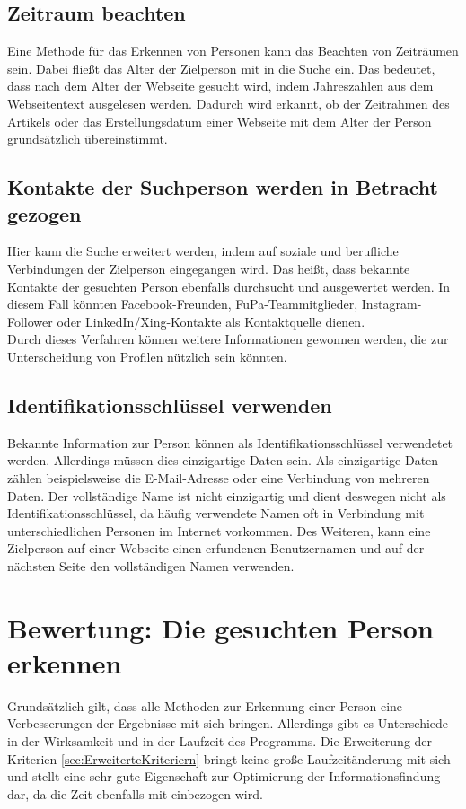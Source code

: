 	\subsection{Zeitraum beachten}
	Eine Methode für das Erkennen von Personen kann das Beachten von Zeiträumen sein. Dabei fließt das Alter der Zielperson mit in die Suche ein. Das bedeutet, dass nach dem Alter der Webseite gesucht wird, indem Jahreszahlen aus dem Webseitentext ausgelesen werden. Dadurch wird erkannt, ob der Zeitrahmen des Artikels oder das Erstellungsdatum einer Webseite mit dem Alter der Person grundsätzlich übereinstimmt.

	\subsection{Kontakte der Suchperson werden in Betracht gezogen}	
	Hier kann die Suche erweitert werden, indem auf soziale und berufliche Verbindungen der Zielperson eingegangen wird. Das heißt, dass bekannte Kontakte der gesuchten Person ebenfalls durchsucht und ausgewertet werden. In diesem Fall könnten Facebook-Freunden, FuPa-Teammitglieder, Instagram-Follower oder LinkedIn/Xing-Kontakte als Kontaktquelle dienen.\\
	Durch dieses Verfahren können weitere Informationen gewonnen werden, die zur Unterscheidung von Profilen nützlich sein könnten.
	
	\subsection{Identifikationsschlüssel verwenden}
	Bekannte Information zur Person können als Identifikationsschlüssel verwendetet werden. Allerdings müssen dies einzigartige Daten sein. Als einzigartige Daten zählen beispielsweise die E-Mail-Adresse oder eine Verbindung von mehreren Daten. Der vollständige Name ist nicht einzigartig und dient deswegen nicht als Identifikationsschlüssel, da häufig verwendete Namen oft in Verbindung mit unterschiedlichen Personen im Internet vorkommen. Des Weiteren, kann eine Zielperson auf einer Webseite einen erfundenen Benutzernamen und auf der nächsten Seite den vollständigen Namen verwenden.\\

\section{Bewertung: Die gesuchten Person erkennen}
Grundsätzlich gilt, dass alle Methoden zur Erkennung einer Person eine Verbesserungen der Ergebnisse mit sich bringen. Allerdings gibt es Unterschiede in der Wirksamkeit und in der Laufzeit des Programms.
Die Erweiterung der Kriterien \ref{sec:ErweiterteKriteriern} bringt keine große Laufzeitänderung mit sich und stellt eine sehr gute Eigenschaft zur Optimierung der Informationsfindung dar, da die Zeit ebenfalls mit einbezogen wird.
